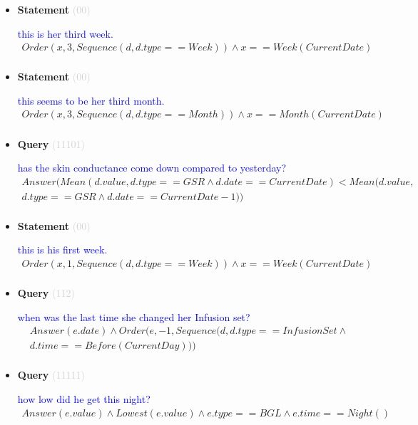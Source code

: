 \documentclass[11pt]{article}
\newcommand{\key}[1]{\textcolor{lightgray}{#1}}
\newcounter{CQuery}
\newcounter{CStatement}
\begin{document}
\begin{itemize}
\item
\textbf{Statement\theCStatement} \key{(00)} \addtocounter{CStatement}{1}
\textcolor{blue}{ this is her third week. }
\begin{multline*}
Order(x, 3, Sequence(d, d.type==Week)) \wedge x==Week(CurrentDate) \\ 
\end{multline*}


\item
\textbf{Statement\theCStatement} \key{(00)} \addtocounter{CStatement}{1}
\textcolor{blue}{ this seems to be her third month. }
\begin{multline*}
Order(x, 3, Sequence(d, d.type==Month)) \wedge x==Month(CurrentDate) \\ 
\end{multline*}


\item
\textbf{Query\theCQuery} \key{(11101)} \addtocounter{CQuery}{1}
\textcolor{blue}{ has the skin conductance come down compared to yesterday? }
\begin{multline*}
Answer(Mean(d.value, d.type==GSR \wedge d.date==CurrentDate) < Mean(d.value, \\ 
d.type==GSR \wedge d.date==CurrentDate-1)) \\ 
\end{multline*}


\item
\textbf{Statement\theCStatement} \key{(00)} \addtocounter{CStatement}{1}
\textcolor{blue}{ this is his first week. }
\begin{multline*}
Order(x, 1, Sequence(d, d.type==Week)) \wedge x==Week(CurrentDate) \\ 
\end{multline*}


\item
\textbf{Query\theCQuery} \key{(112)} \addtocounter{CQuery}{1}
\textcolor{blue}{ when was the last time she changed her Infusion set? }
\begin{multline*}
Answer(e.date) \wedge Order(e, -1, Sequence(d, d.type==InfusionSet\wedge \\ 
d.time==Before(CurrentDay))) \\ 
\end{multline*}


\item
\textbf{Query\theCQuery} \key{(11111)} \addtocounter{CQuery}{1}
\textcolor{blue}{ how low did he get this night? }
\begin{multline*}
Answer(e.value) \wedge Lowest(e.value) \wedge e.type==BGL \wedge e.time==Night() \\ 
\end{multline*}



\end{itemize}
\end{document}
